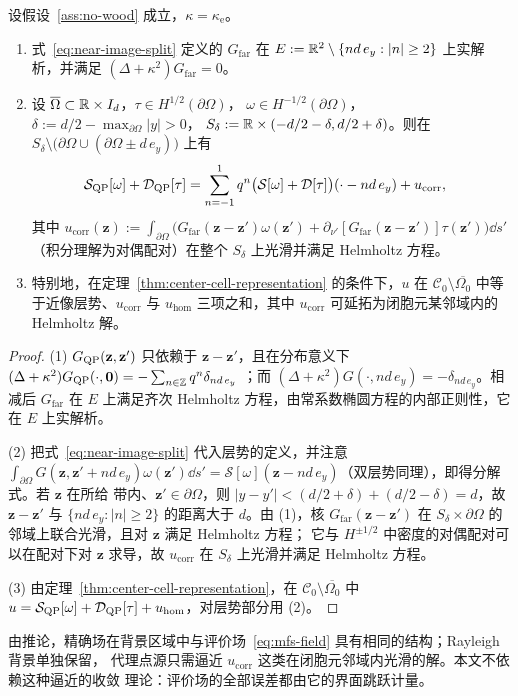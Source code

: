 \begin{corollary}[近像分解]
  \label{cor:near-image}
  设假设~\ref{ass:no-wood} 成立，$\kappa=\kappa_{\mathrm e}$。
  \begin{enumerate}
    \item 式~\eqref{eq:near-image-split} 定义的 $G_{\mathrm{far}}$ 在
      $E:=\mathbb{R}^2\setminus\{nd\,e_y:|n|\geq2\}$ 上实解析，并满足
      $(\Delta+\kappa^2)G_{\mathrm{far}}=0$。
    \item 设 $\overline{\Omega}\subset\mathbb{R}\times I_d$，$\tau\in H^{1/2}(\partial\Omega)$，
      $\omega\in H^{-1/2}(\partial\Omega)$，$\delta:=d/2-\max_{\partial\Omega}|y|>0$，
      $S_\delta:=\mathbb{R}\times(-d/2-\delta,d/2+\delta)$。则在
      $S_\delta\setminus\bigl(\partial\Omega\cup(\partial\Omega\pm d\,e_y)\bigr)$ 上有
      \begin{align*}
        \mathcal S_{\mathrm{QP}}[\omega]+\mathcal D_{\mathrm{QP}}[\tau]
        &=\sum_{n=-1}^{1}q^n\bigl(\mathcal S[\omega]+\mathcal D[\tau]\bigr)(\cdot-nd\,e_y)
          +u_{\mathrm{corr}},
      \end{align*}
      其中 $u_{\mathrm{corr}}(\mathbf z):=\int_{\partial\Omega}\bigl(
      G_{\mathrm{far}}(\mathbf z-\mathbf z')\omega(\mathbf z')
      +\partial_{\nu'}[G_{\mathrm{far}}(\mathbf z-\mathbf z')]\tau(\mathbf z')\bigr)\dd s'$
      （积分理解为对偶配对）在整个 $S_\delta$ 上光滑并满足 Helmholtz 方程。
    \item 特别地，在定理~\ref{thm:center-cell-representation} 的条件下，$u$ 在
      $\mathcal C_0\setminus\overline{\Omega_0}$ 中等于近像层势、$u_{\mathrm{corr}}$ 与
      $u_{\mathrm{hom}}$ 三项之和，其中 $u_{\mathrm{corr}}$ 可延拓为闭胞元某邻域内的
      Helmholtz 解。
  \end{enumerate}
\end{corollary}

\begin{proof}
  (1) $G_{\mathrm{QP}}(\mathbf z,\mathbf z')$ 只依赖于 $\mathbf z-\mathbf z'$，且在分布意义下
  $(\Delta+\kappa^2)G_{\mathrm{QP}}(\cdot,\mathbf 0)=-\sum_{n\in\mathbb{Z}}q^n\delta_{nd\,e_y}$
  \cite{Linton1998}；而 $(\Delta+\kappa^2)G(\cdot,nd\,e_y)=-\delta_{nd\,e_y}$。相减后
  $G_{\mathrm{far}}$ 在 $E$ 上满足齐次 Helmholtz 方程，由常系数椭圆方程的内部正则性，它在
  $E$ 上实解析。

  (2) 把式~\eqref{eq:near-image-split} 代入层势的定义，并注意
  $\int_{\partial\Omega}G(\mathbf z,\mathbf z'+nd\,e_y)\omega(\mathbf z')\dd s'
  =\mathcal S[\omega](\mathbf z-nd\,e_y)$（双层势同理），即得分解式。若 $\mathbf z$ 在所给
  带内、$\mathbf z'\in\partial\Omega$，则 $|y-y'|<(d/2+\delta)+(d/2-\delta)=d$，故 $\mathbf z-\mathbf z'$ 与
  $\{nd\,e_y:|n|\geq2\}$ 的距离大于 $d$。由 (1)，核 $G_{\mathrm{far}}(\mathbf z-\mathbf z')$ 在
  $S_\delta\times\partial\Omega$ 的邻域上联合光滑，且对 $\mathbf z$ 满足 Helmholtz 方程；
  它与 $H^{\pm1/2}$ 中密度的对偶配对可以在配对下对 $\mathbf z$ 求导，故
  $u_{\mathrm{corr}}$ 在 $S_\delta$ 上光滑并满足 Helmholtz 方程。

  (3) 由定理~\ref{thm:center-cell-representation}，在 $\mathcal C_0\setminus\overline{\Omega_0}$
  中 $u=\mathcal S_{\mathrm{QP}}[\omega]+\mathcal D_{\mathrm{QP}}[\tau]+u_{\mathrm{hom}}$，对层势部分用 (2)。
\end{proof}

由推论，精确场在背景区域中与评价场~\eqref{eq:mfs-field} 具有相同的结构；Rayleigh 背景单独保留，
代理点源只需逼近 $u_{\mathrm{corr}}$ 这类在闭胞元邻域内光滑的解。本文不依赖这种逼近的收敛
理论：评价场的全部误差都由它的界面跳跃计量。

